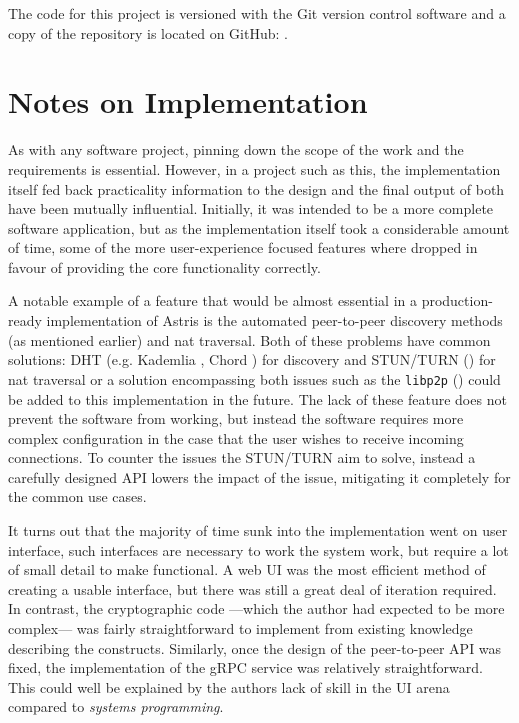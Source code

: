 The code for this project is versioned with the Git version control software and a copy of the repository is located on GitHub: \surl{\astrisrepo}.

\section{Notes on Implementation}
\label{ch:sw:notes}

As with any software project, pinning down the scope of the work and the requirements is essential. However, in a project such as this, the implementation itself fed back practicality information to the design and the final output of both have been mutually influential. Initially, it was intended to be a more complete software application, but as the implementation itself took a considerable amount of time, some of the more user-experience focused features where dropped in favour of providing the core functionality correctly.

A notable example of a feature that would be almost essential in a production-ready implementation of Astris is the automated peer-to-peer discovery methods (as mentioned earlier) and \gls{nat} traversal. Both of these problems have common solutions: DHT (e.g. Kademlia \cite{maymounkovKademliaPeertopeerInformation2002}, Chord \cite{ionstoicaChordScalablePeertopeer}) for discovery and STUN/TURN () for \gls{nat} traversal or a solution encompassing both issues such as the \texttt{libp2p} () could be added to this implementation in the future. The lack of these feature does not prevent the software from working, but instead the software requires more complex configuration in the case that the user wishes to receive incoming connections. To counter the issues the STUN/TURN aim to solve, instead a carefully designed API lowers the impact of the issue, mitigating it completely for the common use cases.

It turns out that the majority of time sunk into the implementation went on user interface, such interfaces are necessary to work the system work, but require a lot of small detail to make functional. A web UI was the most efficient method of creating a usable interface, but there was still a great deal of iteration required. In contrast, the cryptographic code ---which the author had expected to be more complex--- was fairly straightforward to implement from existing knowledge describing the constructs. Similarly, once the design of the peer-to-peer API was fixed, the implementation of the gRPC service was relatively straightforward. This could well be explained by the authors lack of skill in the UI arena compared to \emph{systems programming}.


